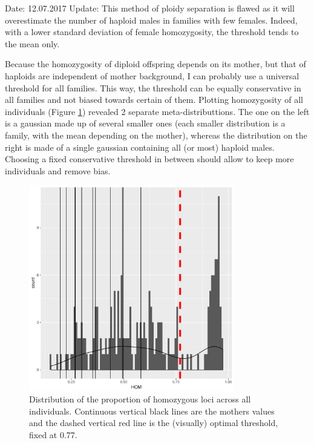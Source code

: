 \documentclass[10pt,a4paper]{report}
\begin{document}
Date: 12.07.2017
Update: This method of ploidy separation is flawed as it will overestimate the number of haploid males in families with few females. Indeed, with a lower standard deviation of female homozygosity, the threshold tends to the mean only.

Because the homozygosity of diploid offspring depends on its mother, but that of haploids are independent of mother background, I can probably use a universal threshold for all families. This way, the threshold can be equally conservative in all families and not biased towards certain of them. Plotting homozygosity of all individuals (Figure \ref{ploidy_fixed}) revealed 2 separate meta-distributtions. The one on the left is a gaussian made up of several smaller ones (each smaller distribution is a family, with the mean depending on the mother), whereas the distribution on the right is made of a single gaussian containing all (or most) haploid males.
Choosing a fixed conservative threshold in between should allow to keep more individuals and remove bias.

\begin{figure}[h]
	\begin{center}
		\includegraphics[width=0.8\textwidth]{cleaning_genomic_data/ploidy_sep_fixed.pdf}
		\caption{Distribution of the proportion of homozygous loci across all individuals. Continuous vertical black lines are the mothers values and the dashed vertical red line is the (visually) optimal threshold, fixed at 0.77.}
		\label{ploidy_fixed}
	\end{center}
\end{figure}
\end{document}
